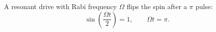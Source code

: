 \documentclass{article}
\begin{document}
A resonant drive with Rabi frequency $\Omega$ flips the spin after a $\pi$ pulse:
\begin{equation}
\sin\left(\frac{\Omega t}{2}\right) = 1, \qquad \Omega t = \pi .
\label{eq:pi}
\end{equation}
\end{document}
